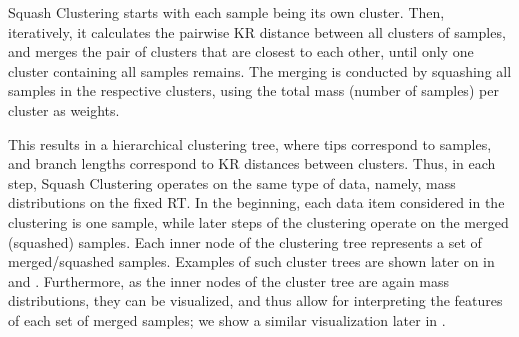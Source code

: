 Squash Clustering starts with each sample being its own cluster.
Then, iteratively, it calculates the pairwise KR distance between all clusters of samples,
and merges the pair of clusters that are closest to each other,
until only one cluster containing all samples remains.
The merging is conducted by squashing all samples in the respective clusters,
using the total mass (number of samples) per cluster as weights.

This results in a hierarchical clustering tree, where tips correspond to samples,
and branch lengths correspond to KR distances between clusters.
Thus, in each step, Squash Clustering operates on the same type of data, namely, mass distributions on the fixed \ac{RT}.
In the beginning, each data item considered in the clustering is one sample,
while later steps of the clustering operate on the merged (squashed) samples.
Each inner node of the clustering tree represents a set of merged/squashed samples.
Examples of such cluster trees are shown later on in  and .
Furthermore, as the inner nodes of the cluster tree are again mass distributions,
they can be visualized, and thus allow for interpreting the features of each set of merged samples;
we show a similar visualization later in .

